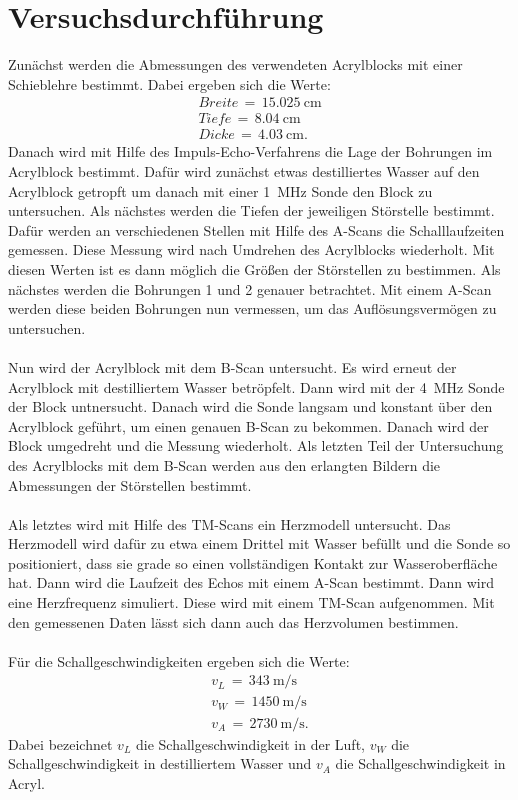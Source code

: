 \documentclass[
  bibliography=totoc,     %
  captions=tableheading,  %
  titlepage=firstiscover, %
]{scrartcl}
\begin{document}
\section{Versuchsdurchführung}
\label{sec:versuchsdurchführung}
Zunächst werden die Abmessungen des verwendeten Acrylblocks mit einer
Schieblehre
bestimmt. Dabei ergeben sich die Werte:
\begin{align*}
  Breite\,=\,\SI{15.025}{\centi\meter} \\
  Tiefe\,=\,\SI{8.04}{\centi\meter} \\
  Dicke\,=\,\SI{4.03}{\centi\meter}.
\end{align*}
Danach wird mit Hilfe des Impuls-Echo-Verfahrens die Lage der Bohrungen im
Acrylblock bestimmt. Dafür wird zunächst etwas destilliertes Wasser auf den
Acrylblock getropft um danach mit einer \SI{1}{\mega\hertz} Sonde den Block zu
untersuchen.
Als nächstes werden die Tiefen der jeweiligen Störstelle bestimmt. Dafür
werden an verschiedenen Stellen mit Hilfe des A-Scans die Schalllaufzeiten
gemessen. Diese Messung wird nach Umdrehen des Acrylblocks wiederholt. Mit
diesen Werten ist es dann möglich die Größen der Störstellen zu bestimmen.
Als nächstes werden die Bohrungen 1 und 2 genauer betrachtet. Mit einem A-Scan
werden diese beiden Bohrungen nun vermessen, um das Auflösungsvermögen zu
untersuchen.\\
\\
Nun wird der Acrylblock mit dem B-Scan untersucht. Es wird erneut der
Acrylblock mit destilliertem Wasser betröpfelt. Dann wird mit der
\SI{4}{\mega\hertz} Sonde der Block untnersucht. Danach wird die Sonde langsam
und konstant über den Acrylblock geführt, um einen genauen B-Scan zu bekommen.
Danach wird der Block umgedreht und die Messung wiederholt. Als letzten Teil
der Untersuchung des Acrylblocks mit dem B-Scan werden aus den erlangten
Bildern die Abmessungen der Störstellen bestimmt. \\
\\
Als letztes wird mit Hilfe des TM-Scans ein Herzmodell untersucht. Das
Herzmodell wird dafür zu etwa einem Drittel mit Wasser befüllt und die Sonde so
positioniert, dass sie grade so einen vollständigen Kontakt zur
Wasseroberfläche hat.
Dann wird die Laufzeit des Echos mit einem A-Scan bestimmt. Dann wird eine
Herzfrequenz simuliert. Diese wird mit einem TM-Scan
aufgenommen. Mit den gemessenen Daten lässt sich dann auch das Herzvolumen
bestimmen.\\
\\
Für die Schallgeschwindigkeiten ergeben sich die Werte:
\begin{align*}
  v_L\,=\,\SI{343}{\meter\per\second} \\
  v_W\,=\,\SI{1450}{\meter\per\second} \\
  v_A\,=\,\SI{2730}{\meter\per\second}.
\end{align*}
Dabei bezeichnet $v_L$ die Schallgeschwindigkeit in der Luft, $v_W$ die
Schallgeschwindigkeit in destilliertem Wasser und $v_A$ die
Schallgeschwindigkeit in Acryl.
\end{document}
